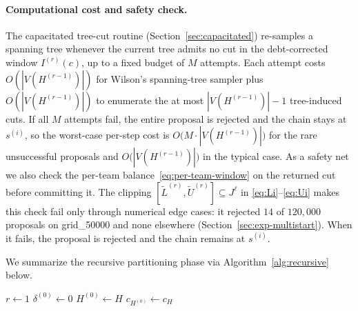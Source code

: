 \documentclass[preprint,12pt,authoryear]{elsarticle}
\theoremstyle{definition}
\begin{document}
\paragraph{Computational cost and safety check.}
The capacitated tree-cut routine
(Section~\ref{sec:capacitated}) re-samples a spanning tree whenever
the current tree admits no cut in the debt-corrected window
$I^{(r)}(c)$, up to a fixed budget of $M$ attempts. Each attempt
costs $O(|V(H^{(r-1)})|)$ for Wilson's spanning-tree sampler plus
$O(|V(H^{(r-1)})|)$ to enumerate the at most
$|V(H^{(r-1)})|-1$ tree-induced cuts. If all $M$ attempts fail, the
entire proposal is rejected and the chain stays at $s^{(i)}$, so the
worst-case per-step cost is
$O\bigl(M \cdot |V(H^{(r-1)})|\bigr)$ for the rare unsuccessful
proposals and $O\bigl(|V(H^{(r-1)})|\bigr)$ in the typical case. As a safety net we also check the per-team balance~\eqref{eq:per-team-window} on the returned cut before committing it. The clipping $[\widetilde L^{(r)},\widetilde U^{(r)}] \subseteq J^{\ell}$ in \eqref{eq:Li}--\eqref{eq:Ui} makes this check fail only through numerical edge cases: it rejected $14$ of $120{,}000$ proposals on grid\_50000 and none elsewhere (Section~\ref{sec:exp-multistart}). When it fails, the proposal is rejected and the chain remains at $s^{(i)}$. 

We summarize the recursive partitioning phase via Algorithm~\ref{alg:recursive} below.

\medskip
\medskip

\begin{algorithm}[H]
\LinesNumbered
\caption{Recursive partitioning phase at level $\ell$}\label{alg:recursive}

\BlankLine

$r \leftarrow 1$\; 
$\delta^{(0)} \leftarrow 0$\;
$H^{(0)} \leftarrow H$\;
$c_{H^{(0)}} \leftarrow c_H$\; 
\vspace{1mm}


\end{algorithm}
\end{document}

